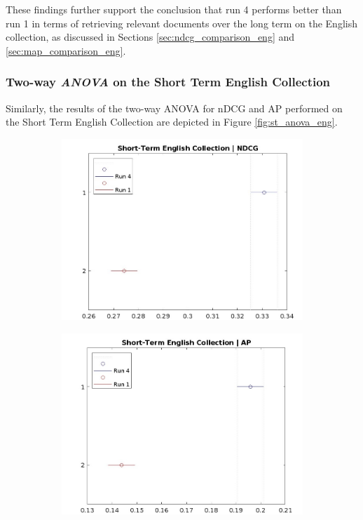 These findings further support the conclusion that run 4 performs better than run 1 in terms of retrieving relevant documents over the long term on the English collection, as discussed in Sections \ref{sec:ndcg_comparison_eng} and \ref{sec:map_comparison_eng}.


\newpage
\enlargethispage{5\baselineskip}
\subsubsection{Two-way \textit{ANOVA} on the Short Term English Collection}

Similarly, the results of the two-way \ac{ANOVA} for \ac{nDCG} and \ac{AP} performed on the Short Term English Collection are depicted in Figure \ref{fig:st_anova_eng}.

\begin{figure}[!h]
    \centering
    \begin{subfigure}[b]{0.49\textwidth}
        \includegraphics[width=\textwidth]{figure/StatisticalAnalysis/ANOVA 2/ndcg-st-en.jpeg}
        \label{fig:st_anova_eng_ndcg}        
    \end{subfigure}
    \hfill
    \begin{subfigure}[b]{0.49\textwidth}
        \includegraphics[width=\textwidth]{figure/StatisticalAnalysis/ANOVA 2/ap-st-en.jpeg}

\end{subfigure}
\end{figure}
